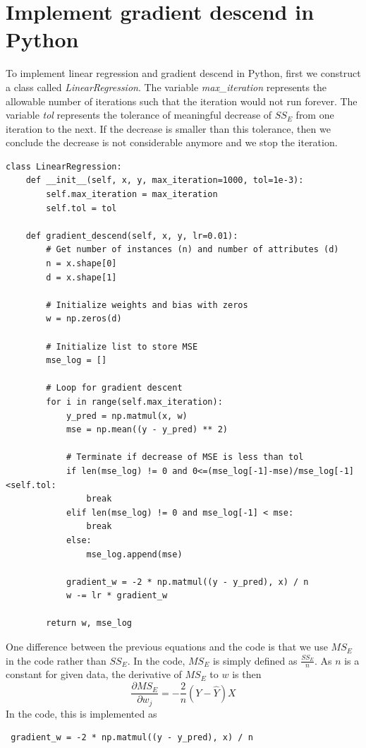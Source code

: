\documentclass[
	letterpaper
]{article}
\begin{document}
\section{Implement gradient descend in Python}
To implement linear regression and gradient descend in Python, first we construct a class called \textit{LinearRegression}.
The variable \textit{max\_iteration} represents the allowable number of iterations such that the iteration would not run forever.
The variable \textit{tol} represents the tolerance of meaningful decrease of $SS_E$ from one iteration to the next.
If the decrease is smaller than this tolerance, then we conclude the decrease is not considerable anymore and we stop the iteration.
\begin{lstlisting}
class LinearRegression:
    def __init__(self, x, y, max_iteration=1000, tol=1e-3):
        self.max_iteration = max_iteration
        self.tol = tol
        
    def gradient_descend(self, x, y, lr=0.01):
        # Get number of instances (n) and number of attributes (d)
        n = x.shape[0]
        d = x.shape[1]

        # Initialize weights and bias with zeros
        w = np.zeros(d)

        # Initialize list to store MSE
        mse_log = []

        # Loop for gradient descent
        for i in range(self.max_iteration):
            y_pred = np.matmul(x, w)
            mse = np.mean((y - y_pred) ** 2)

            # Terminate if decrease of MSE is less than tol
            if len(mse_log) != 0 and 0<=(mse_log[-1]-mse)/mse_log[-1]<self.tol:
                break
            elif len(mse_log) != 0 and mse_log[-1] < mse:
                break
            else:
                mse_log.append(mse)

            gradient_w = -2 * np.matmul((y - y_pred), x) / n
            w -= lr * gradient_w

        return w, mse_log
\end{lstlisting}

One difference between the previous equations and the code is that we use $MS_E$ in the code rather than $SS_E$.
In the code, $MS_E$ is simply defined as $\frac{SS_E}{n}$.
As $n$ is a constant for given data, the derivative of $MS_E$ to $w$ is then
\begin{equation}
\frac{\partial MS_E}{\partial w_j} = -\frac{2}{n} (Y - \hat Y)X
\end{equation}
In the code, this is implemented as 
\begin{lstlisting}
 gradient_w = -2 * np.matmul((y - y_pred), x) / n
\end{lstlisting}
\end{document}

